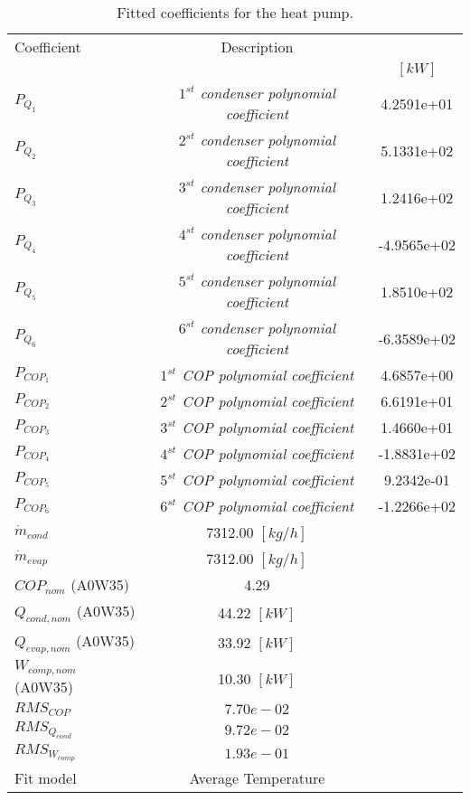 \documentclass[english]{SPFShortReport}
\author{Dani Carbonell}
\begin{document}
\begin{table}[!ht]
\begin{small}
\caption{Fitted coefficients for the heat pump.}
\begin{center}
\resizebox{12cm}{!} 
{
\begin{tabular}{l | c c } 
\hline
\hline
Coefficient &Description & \\ 
 & &$[kW]$\\ 
\hline
$P_{Q_{1}}$ & \emph{$1^{st}$ condenser polynomial coefficient}  & 4.2591e+01    \\ 
$P_{Q_{2}}$ & \emph{$2^{st}$ condenser polynomial coefficient}  & 5.1331e+02    \\ 
$P_{Q_{3}}$ & \emph{$3^{st}$ condenser polynomial coefficient}  & 1.2416e+02    \\ 
$P_{Q_{4}}$ & \emph{$4^{st}$ condenser polynomial coefficient}  & -4.9565e+02    \\ 
$P_{Q_{5}}$ & \emph{$5^{st}$ condenser polynomial coefficient}  & 1.8510e+02    \\ 
$P_{Q_{6}}$ & \emph{$6^{st}$ condenser polynomial coefficient}  & -6.3589e+02    \\ 
\hline
$P_{COP_{1}}$ & \emph{$1^{st}$ COP polynomial coefficient}  & 4.6857e+00    \\ 
$P_{COP_{2}}$ & \emph{$2^{st}$ COP polynomial coefficient}  & 6.6191e+01    \\ 
$P_{COP_{3}}$ & \emph{$3^{st}$ COP polynomial coefficient}  & 1.4660e+01    \\ 
$P_{COP_{4}}$ & \emph{$4^{st}$ COP polynomial coefficient}  & -1.8831e+02    \\ 
$P_{COP_{5}}$ & \emph{$5^{st}$ COP polynomial coefficient}  & 9.2342e-01    \\ 
$P_{COP_{6}}$ & \emph{$6^{st}$ COP polynomial coefficient}  & -1.2266e+02    \\ 
\hline
$\dot m_{cond}$ & 7312.00 $[kg/h]$ \\ 
$\dot m_{evap}$ & 7312.00 $[kg/h]$ \\ 
\hline
$COP_{nom}$ (A0W35)& 4.29 \\ 
$Q_{cond,nom}$ (A0W35)& 44.22 $[kW]$\\ 
$Q_{evap,nom}$ (A0W35)& 33.92 $[kW]$\\ 
$W_{comp,nom}$ (A0W35)& 10.30 $[kW]$\\ 
\hline
 $RMS_{COP}$ & $7.70e-02$ \\ 
 $RMS_{Q_{cond}}$ & $9.72e-02$ \\ 
 $RMS_{W_{comp}}$ & $1.93e-01$ \\ 
\hline
Fit model & Average Temperature\\ 
\hline
\hline
\end{tabular}
}
\label{CoefTable}
\end{center}
\end{small}
\end{table}
\end{document}
